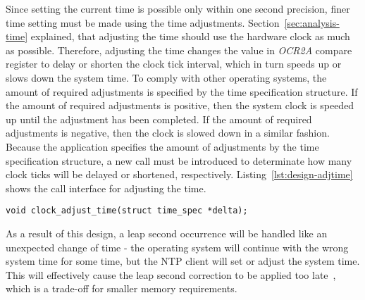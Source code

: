 Since setting the current time is possible only within one second precision,
finer time setting must be made using the time adjustments.
Section~\ref{sec:analysis-time} explained, that adjusting the time
should use the hardware clock as much as possible.
Therefore, adjusting the time changes the value in {\it{OCR2A}} compare register
to delay or shorten the clock tick interval,
which in turn speeds up or slows down the system time.
To comply with other operating systems,
the amount of required adjustments is specified by the time specification structure.
If the amount of required adjustments is positive, then the system clock is speeded up
until the adjustment has been completed.
If the amount of required adjustments is negative, then the clock is slowed down in a similar fashion.
Because the application specifies the amount of adjustments by the time specification structure,
a new call must be introduced to determinate how many
clock ticks will be delayed or shortened, respectively.
Listing~\ref{lst:design-adjtime} shows the call interface for adjusting the time.
\begin{lstlisting}[caption={Call interface for adjusting the time},label={lst:design-adjtime}]
void clock_adjust_time(struct time_spec *delta);
\end{lstlisting}

As a result of this design, a leap second occurrence will be handled like an unexpected change of time -
the operating system will continue with the wrong system time for some time,
but the NTP client will set or adjust the system time.
This will effectively cause the leap second correction to be applied too late~\cite{ntp-faq},
which is a trade-off for smaller memory requirements.
